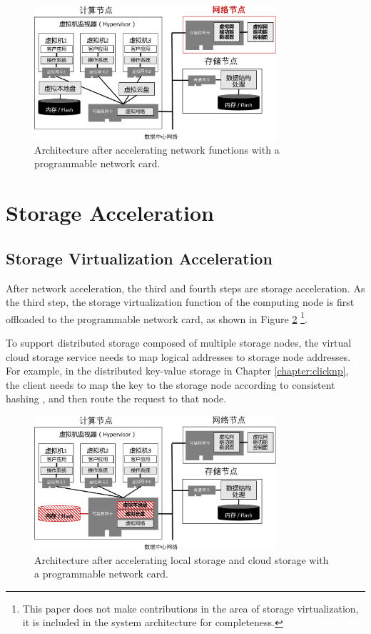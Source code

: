 \begin{figure}[htbp]
	\centering
	\includegraphics[width=0.8\textwidth]{figures/NFV_accel.pdf}
	\caption{Architecture after accelerating network functions with a programmable network card.}
	\label{arch:fig:network-function}
\end{figure}

\section{Storage Acceleration}

\subsection{Storage Virtualization Acceleration}

After network acceleration, the third and fourth steps are storage acceleration. As the third step, the storage virtualization function of the computing node is first offloaded to the programmable network card, as shown in Figure \ref{arch:fig:virt-storage} \footnote{This paper does not make contributions in the area of storage virtualization, it is included in the system architecture for completeness.}.

To support distributed storage composed of multiple storage nodes, the virtual cloud storage service needs to map logical addresses to storage node addresses. For example, in the distributed key-value storage in Chapter \ref{chapter:clicknp}, the client needs to map the key to the storage node according to consistent hashing \cite{nishtala2013scaling}, and then route the request to that node.

\begin{figure}[htbp]
	\centering
	\includegraphics[width=0.8\textwidth]{figures/virt_storage.pdf}
	\caption{Architecture after accelerating local storage and cloud storage with a programmable network card.}
	\label{arch:fig:virt-storage}
\end{figure}

